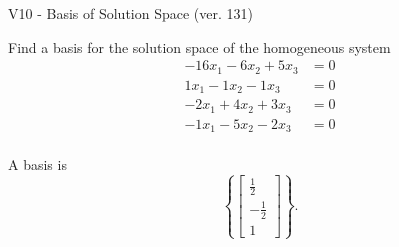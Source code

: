 \begin{exercise}
  \begin{exerciseTitle}V10 - Basis of Solution Space (ver. 131)\end{exerciseTitle}
  \begin{exerciseStatement}
    Find a basis for the solution space of the homogeneous system 
\begin{align*}
 -16 x_ 1 -6 x_ 2 + 5 x_ 3 &= 0  \\ 
  1 x_ 1 -1 x_ 2 -1 x_ 3 &= 0  \\ 
  -2 x_ 1 + 4 x_ 2 + 3 x_ 3 &= 0  \\ 
  -1 x_ 1 -5 x_ 2 -2 x_ 3 &= 0  \\ 
 \end{align*}


 
  \end{exerciseStatement}

  \begin{exerciseAnswer}
   A basis is   
\[\left\{\left[\begin{array}{c}
\frac{1}{2} \\
-\frac{1}{2} \\
1
\end{array}\right]\right\}.\]

  


  \end{exerciseAnswer}
\end{exercise}